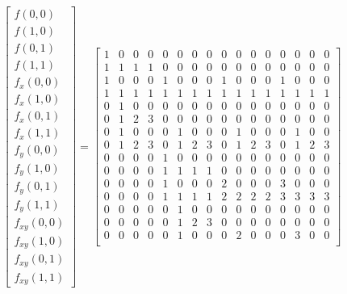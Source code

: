 \setcounter{MaxMatrixCols}{16}
\[\begin{bmatrix}
    f(0, 0)\\
    f(1, 0)\\
    f(0, 1)\\
    f(1, 1)\\
    f_x(0, 0)\\
    f_x(1, 0)\\
    f_x(0, 1)\\
    f_x(1, 1)\\
    f_y(0, 0)\\
    f_y(1, 0)\\
    f_y(0, 1)\\
    f_y(1, 1)\\
    f_{xy}(0, 0)\\
    f_{xy}(1, 0)\\
    f_{xy}(0, 1)\\
    f_{xy}(1, 1)
\end{bmatrix} = 
\begin{bmatrix}
    1 & 0 & 0 & 0 & 0 & 0 & 0 & 0 & 0 & 0 & 0 & 0 & 0 & 0 & 0 & 0 \\
    1 & 1 & 1 & 1 & 0 & 0 & 0 & 0 & 0 & 0 & 0 & 0 & 0 & 0 & 0 & 0 \\
    1 & 0 & 0 & 0 & 1 & 0 & 0 & 0 & 1 & 0 & 0 & 0 & 1 & 0 & 0 & 0 \\
    1 & 1 & 1 & 1 & 1 & 1 & 1 & 1 & 1 & 1 & 1 & 1 & 1 & 1 & 1 & 1 \\
    0 & 1 & 0 & 0 & 0 & 0 & 0 & 0 & 0 & 0 & 0 & 0 & 0 & 0 & 0 & 0 \\
    0 & 1 & 2 & 3 & 0 & 0 & 0 & 0 & 0 & 0 & 0 & 0 & 0 & 0 & 0 & 0 \\ 
    0 & 1 & 0 & 0 & 0 & 1 & 0 & 0 & 0 & 1 & 0 & 0 & 0 & 1 & 0 & 0 \\ 
    0 & 1 & 2 & 3 & 0 & 1 & 2 & 3 & 0 & 1 & 2 & 3 & 0 & 1 & 2 & 3 \\ 
    0 & 0 & 0 & 0 & 1 & 0 & 0 & 0 & 0 & 0 & 0 & 0 & 0 & 0 & 0 & 0 \\ 
    0 & 0 & 0 & 0 & 1 & 1 & 1 & 1 & 0 & 0 & 0 & 0 & 0 & 0 & 0 & 0 \\ 
    0 & 0 & 0 & 0 & 1 & 0 & 0 & 0 & 2 & 0 & 0 & 0 & 3 & 0 & 0 & 0 \\ 
    0 & 0 & 0 & 0 & 1 & 1 & 1 & 1 & 2 & 2 & 2 & 2 & 3 & 3 & 3 & 3 \\ 
    0 & 0 & 0 & 0 & 0 & 1 & 0 & 0 & 0 & 0 & 0 & 0 & 0 & 0 & 0 & 0 \\ 
    0 & 0 & 0 & 0 & 0 & 1 & 2 & 3 & 0 & 0 & 0 & 0 & 0 & 0 & 0 & 0 \\ 
    0 & 0 & 0 & 0 & 0 & 1 & 0 & 0 & 0 & 2 & 0 & 0 & 0 & 3 & 0 & 0 \\

\end{bmatrix}\]
